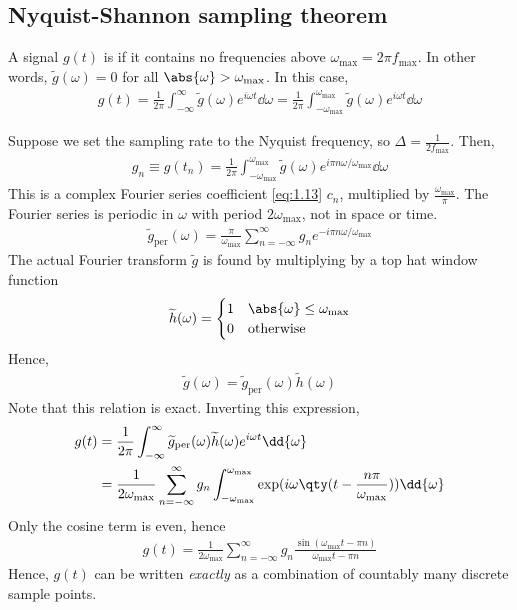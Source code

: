 \subsection{Nyquist-Shannon sampling theorem}
\begin{definition}
	A signal $g(t)$ is  if it contains no frequencies above $\omega_{\max} = 2\pi f_{\max}$.
	In other words, $\widetilde g(\omega) = 0$ for all $\abs{\omega} > \omega_{\max}$.
	In this case,
	\begin{align} \label{eq:8.41}
		g(t) = \frac{1}{2\pi} \int_{-\infty}^\infty \widetilde g(\omega) e^{i\omega t} \dd{\omega} = \frac{1}{2\pi} \int_{-\omega_{\max}}^{\omega_{\max}} \widetilde g(\omega) e^{i\omega t} \dd{\omega}
	\end{align}
\end{definition}

Suppose we set the sampling rate to the Nyquist frequency, so $\Delta = \frac{1}{2f_{\max}}$.
Then,
\begin{align*}
	g_n \equiv g(t_n) = \frac{1}{2\pi} \int_{-\omega_{\max}}^{\omega_{\max}} \widetilde g(\omega) e^{i\pi n \omega / \omega_{\max}} \dd{\omega}
\end{align*}
This is a complex Fourier series coefficient \cref{eq:1.13} $c_n$, multiplied by $\frac{\omega_{\max}}{\pi}$.
The Fourier series is periodic in $\omega$ with period $2 \omega_{\max}$, not in space or time.
\begin{align} \label{eq:8.42}
	\widetilde g_\mathrm{per}(\omega) = \frac{\pi}{\omega_{\max}} \sum_{n=-\infty}^\infty g_n e^{-i \pi n \omega / \omega_{\max}}
\end{align}
The actual Fourier transform $\widetilde g$ is found by multiplying by a top hat window function
\begin{align*}
	\widetilde h(\omega) = \begin{cases}
		1 & \abs{\omega} \leq \omega_{\max} \\
		0 & \text{otherwise}
	\end{cases}
\end{align*}
Hence,
\begin{align} \label{eq:8.4f}
	\widetilde g(\omega) = \widetilde g_\mathrm{per}(\omega) \widetilde h(\omega)
\end{align}
Note that this relation is exact.
Inverting this expression,
\begin{align*}
	g(t) & = \frac{1}{2\pi} \int_{-\infty}^\infty \widetilde g_\mathrm{per}(\omega) \widetilde h(\omega) e^{i \omega t} \dd{\omega} \\
	& = \frac{1}{2\omega_{\max}} \sum_{n=-\infty}^\infty g_n \int_{-\omega_{\max}}^{\omega_{\max}} \exp(i \omega\qty(t - \frac{n \pi}{\omega_{\max}})) \dd{\omega}
\end{align*}
Only the cosine term is even, hence
\begin{align} \label{eq:8.44}
	g(t) = \frac{1}{2\omega_{\max}} \sum_{n=-\infty}^\infty g_n \frac{\sin(\omega_{\max} t - \pi n)}{\omega_{\max} t - \pi n}
\end{align}
Hence, $g(t)$ can be written \textit{exactly} as a combination of countably many discrete sample points.

